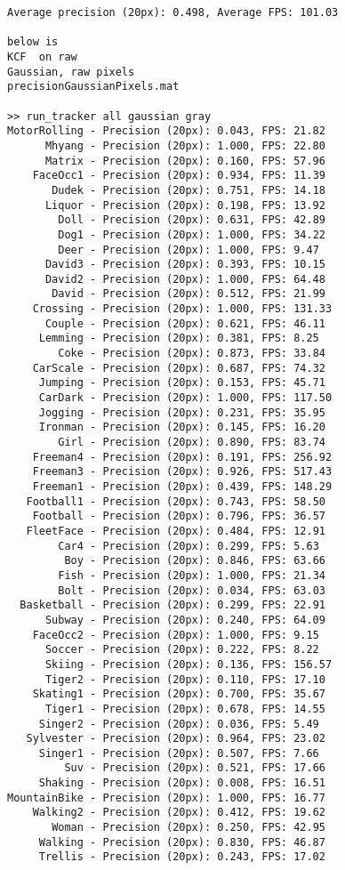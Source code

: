 \begin{lstlisting}
Average precision (20px): 0.498, Average FPS: 101.03

below is
KCF  on raw
Gaussian, raw pixels
precisionGaussianPixels.mat

>> run_tracker all gaussian gray
MotorRolling - Precision (20px): 0.043, FPS: 21.82
      Mhyang - Precision (20px): 1.000, FPS: 22.80
      Matrix - Precision (20px): 0.160, FPS: 57.96
    FaceOcc1 - Precision (20px): 0.934, FPS: 11.39
       Dudek - Precision (20px): 0.751, FPS: 14.18
      Liquor - Precision (20px): 0.198, FPS: 13.92
        Doll - Precision (20px): 0.631, FPS: 42.89
        Dog1 - Precision (20px): 1.000, FPS: 34.22
        Deer - Precision (20px): 1.000, FPS: 9.47
      David3 - Precision (20px): 0.393, FPS: 10.15
      David2 - Precision (20px): 1.000, FPS: 64.48
       David - Precision (20px): 0.512, FPS: 21.99
    Crossing - Precision (20px): 1.000, FPS: 131.33
      Couple - Precision (20px): 0.621, FPS: 46.11
     Lemming - Precision (20px): 0.381, FPS: 8.25
        Coke - Precision (20px): 0.873, FPS: 33.84
    CarScale - Precision (20px): 0.687, FPS: 74.32
     Jumping - Precision (20px): 0.153, FPS: 45.71
     CarDark - Precision (20px): 1.000, FPS: 117.50
     Jogging - Precision (20px): 0.231, FPS: 35.95
     Ironman - Precision (20px): 0.145, FPS: 16.20
        Girl - Precision (20px): 0.890, FPS: 83.74
    Freeman4 - Precision (20px): 0.191, FPS: 256.92
    Freeman3 - Precision (20px): 0.926, FPS: 517.43
    Freeman1 - Precision (20px): 0.439, FPS: 148.29
   Football1 - Precision (20px): 0.743, FPS: 58.50
    Football - Precision (20px): 0.796, FPS: 36.57
   FleetFace - Precision (20px): 0.484, FPS: 12.91
        Car4 - Precision (20px): 0.299, FPS: 5.63
         Boy - Precision (20px): 0.846, FPS: 63.66
        Fish - Precision (20px): 1.000, FPS: 21.34
        Bolt - Precision (20px): 0.034, FPS: 63.03
  Basketball - Precision (20px): 0.299, FPS: 22.91
      Subway - Precision (20px): 0.240, FPS: 64.09
    FaceOcc2 - Precision (20px): 1.000, FPS: 9.15
      Soccer - Precision (20px): 0.222, FPS: 8.22
      Skiing - Precision (20px): 0.136, FPS: 156.57
      Tiger2 - Precision (20px): 0.110, FPS: 17.10
    Skating1 - Precision (20px): 0.700, FPS: 35.67
      Tiger1 - Precision (20px): 0.678, FPS: 14.55
     Singer2 - Precision (20px): 0.036, FPS: 5.49
   Sylvester - Precision (20px): 0.964, FPS: 23.02
     Singer1 - Precision (20px): 0.507, FPS: 7.66
         Suv - Precision (20px): 0.521, FPS: 17.66
     Shaking - Precision (20px): 0.008, FPS: 16.51
MountainBike - Precision (20px): 1.000, FPS: 16.77
    Walking2 - Precision (20px): 0.412, FPS: 19.62
       Woman - Precision (20px): 0.250, FPS: 42.95
     Walking - Precision (20px): 0.830, FPS: 46.87
     Trellis - Precision (20px): 0.243, FPS: 17.02


\end{lstlisting}
